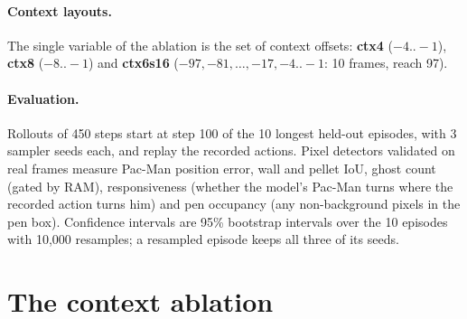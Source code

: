 \documentclass[11pt]{article}
\begin{document}
\paragraph{Context layouts.} The single variable of the ablation is the set of context offsets: \textbf{ctx4}
($-4..-1$), \textbf{ctx8} ($-8..-1$) and \textbf{ctx6s16} ($-97,-81,\dots,-17,-4..-1$: 10 frames, reach 97).

\paragraph{Evaluation.} Rollouts of 450 steps start at step 100 of the 10 longest held-out episodes, with 3 sampler
seeds each, and replay the recorded actions. Pixel detectors validated on real frames measure Pac-Man position
error, wall and pellet IoU, ghost count (gated by RAM), responsiveness (whether the model's Pac-Man turns where the
recorded action turns him) and pen occupancy (any non-background pixels in the pen box). Confidence intervals are
95\% bootstrap intervals over the 10 episodes with 10,000 resamples; a resampled episode keeps all three of its
seeds.

\section{The context ablation}
\label{sec:context}
\begin{table}[h]
\centering\small
{}
\caption{Pen-timer and coherence metrics at the 450-step horizon. Brackets: 95\% bootstrap CIs over episodes; for
parking, the CI of the parked fraction. The parked counts and median stays of Model 1, ctx4, ctx8 and ctx6s16
were first computed without intervals; recomputing them with the bootstrap gives the same values to the precision
first reported. $^*$With no
parked rollout in any of the 10 episodes, the bootstrap interval is degenerate; the exact one-sided 95\% upper bound
on the per-episode parking rate is 0.26.}
\label{tab:context}
\end{table}
\end{document}
